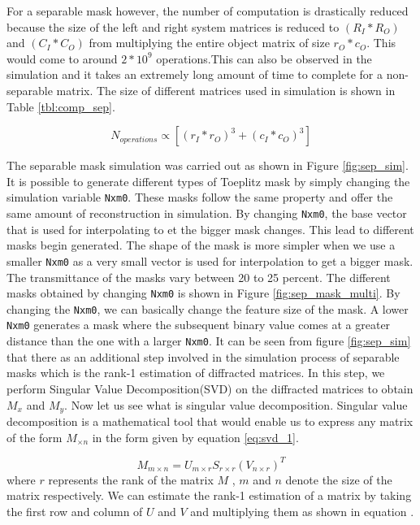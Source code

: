 For a separable mask however, the number of computation is drastically reduced because the size of the left and right system matrices is reduced to $(R_I*R_O)$ and $(C_I*C_O)$ from multiplying the entire object matrix of size $r_O*c_O$. This would come to around $2*10^9$ operations.This can also be observed in the simulation and it takes an extremely long amount of time to complete for a non-separable matrix. The size of different matrices used in simulation is shown in Table \ref{tbl:comp_sep}.

\begin{equation}
N_{operations} \propto [(r_I*r_O)^3 + (c_I*c_O)^3] 
\label{eq:sep_comp}
\end{equation}

The separable mask simulation was carried out as shown in Figure \ref{fig:sep_sim}. It is possible to generate different types of Toeplitz mask by simply changing the simulation variable \texttt{Nxm0}. These masks follow the same property and offer the same amount of reconstruction in simulation. By changing \texttt{Nxm0}, the base vector that is used for interpolating to et the bigger mask changes. This lead to different masks begin generated. The shape of the mask is more simpler when we use a smaller \texttt{Nxm0} as a very small vector is used for interpolation to get a bigger mask. The transmittance of the masks vary between 20 to 25 percent. The different masks obtained by changing \texttt{Nxm0} is shown in Figure \ref{fig:sep_mask_multi}. By changing the \texttt{Nxm0}, we can basically change the feature size of the mask. A lower \texttt{Nxm0} generates a mask where the subsequent binary value comes at a greater distance than the one with a larger \texttt{Nxm0}. It can be seen from figure \ref{fig:sep_sim} that there as an additional step involved in the simulation process of separable masks which is the rank-1 estimation of diffracted matrices. In this step, we perform Singular Value Decomposition(SVD) on the diffracted matrices to obtain $M_x$ and $M_y$. Now let us see what is singular value decomposition. Singular value decomposition is a mathematical tool that would enable us to express any matrix of the form $M_{ \times n}$ in the form given by equation \ref{eq:svd_1}\cite{svd}. 

\begin{equation}
\label{eq:svd_1}
M_{m \times n} = U_{m \times r}S_{r\times r}(V_{n \times r})^T
\end{equation}
where $r$ represents the rank of the matrix $M$ , $m$ and $n$ denote the size of the matrix respectively. We can estimate the rank-1 estimation of a matrix by taking the first row and column of $U$ and $V$ and multiplying them as shown in equation \label{eq:svd_2}.


